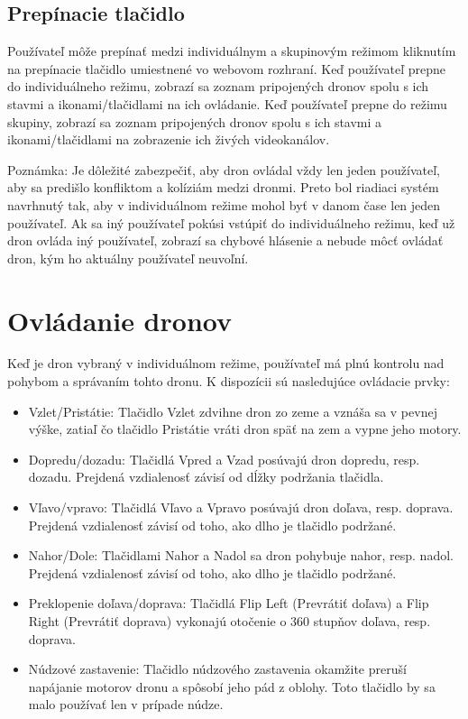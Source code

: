 \documentclass[a4paper]{feidippp}
\begin{document}
\subsection{Prepínacie tlačidlo}
Používateľ môže prepínať medzi individuálnym a skupinovým režimom kliknutím na prepínacie tlačidlo umiestnené vo webovom rozhraní. Keď používateľ prepne do individuálneho režimu, zobrazí sa zoznam pripojených dronov spolu s ich stavmi a ikonami/tlačidlami na ich ovládanie. Keď používateľ prepne do režimu skupiny, zobrazí sa zoznam pripojených dronov spolu s ich stavmi a ikonami/tlačidlami na zobrazenie ich živých videokanálov.

Poznámka: Je dôležité zabezpečiť, aby dron ovládal vždy len jeden používateľ, aby sa predišlo konfliktom a kolíziám medzi dronmi. Preto bol riadiaci systém navrhnutý tak, aby v individuálnom režime mohol byť v danom čase len jeden používateľ. Ak sa iný používateľ pokúsi vstúpiť do individuálneho režimu, keď už dron ovláda iný používateľ, zobrazí sa chybové hlásenie a nebude môcť ovládať dron, kým ho aktuálny používateľ neuvoľní.

\newpage
\section{Ovládanie dronov}

Keď je dron vybraný v individuálnom režime, používateľ má plnú kontrolu nad pohybom a správaním tohto dronu. K dispozícii sú nasledujúce ovládacie prvky:

\begin{itemize}
\item Vzlet/Pristátie: Tlačidlo Vzlet zdvihne dron zo zeme a vznáša sa v pevnej výške, zatiaľ čo tlačidlo Pristátie vráti dron späť na zem a vypne jeho motory.
\item Dopredu/dozadu: Tlačidlá Vpred a Vzad posúvajú dron dopredu, resp. dozadu. Prejdená vzdialenosť závisí od dĺžky podržania tlačidla.
\item Vľavo/vpravo: Tlačidlá Vľavo a Vpravo posúvajú dron doľava, resp. doprava. Prejdená vzdialenosť závisí od toho, ako dlho je tlačidlo podržané.
\item Nahor/Dole: Tlačidlami Nahor a Nadol sa dron pohybuje nahor, resp. nadol. Prejdená vzdialenosť závisí od toho, ako dlho je tlačidlo podržané.
\item Preklopenie doľava/doprava: Tlačidlá Flip Left (Prevrátiť doľava) a Flip Right (Prevrátiť doprava) vykonajú otočenie o 360 stupňov doľava, resp. doprava.
\item Núdzové zastavenie: Tlačidlo núdzového zastavenia okamžite preruší napájanie motorov dronu a spôsobí jeho pád z oblohy. Toto tlačidlo by sa malo používať len v prípade núdze.
\end{itemize}
\end{document}
